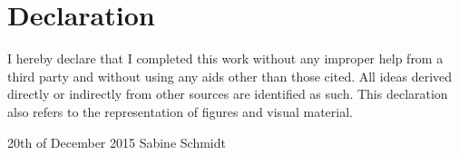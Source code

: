 \thispagestyle{empty}
\section*{Declaration}

I hereby declare that I completed this work without any improper help from a third party and without using any aids other than those cited. All ideas derived directly or indirectly from other sources are identified as such. This declaration also refers to the representation of figures and visual material.




\vspace{3cm}
20th of December 2015 \hfill Sabine Schmidt